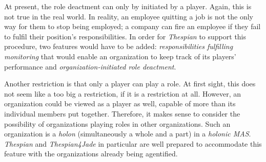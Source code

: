 At present, the role deactment can only by initiated by a player.
Again, this is not true in the real world.
In reality, an employee quitting a job is not the only way for them to stop being employed; a company can fire an employee if they fail to fulfil their position's responsibilities.
In order for \textit{Thespian} to support this procedure, two features would have to be added: \textit{responsibilities fulfilling monitoring} that would enable an organization to keep track of its players' performance and \textit{organization-initiated role deactment}.

Another restriction is that only a player can play a role.
At first sight, this does not seem like a too big a restriction, if it is a restriction at all.
However, an organization could be viewed as a player as well, capable of more than its individual members put together.
Therefore, it makes sense to consider the possibility of organizations playing roles in other organizations.
Such an organization is a \textit{holon} (simultaneously a whole and a part) in a \textit{holonic MAS}.
\textit{Thespian} and \textit{Thespian4Jade} in particular are well prepared to accommodate this feature with the organizations already being agentified.